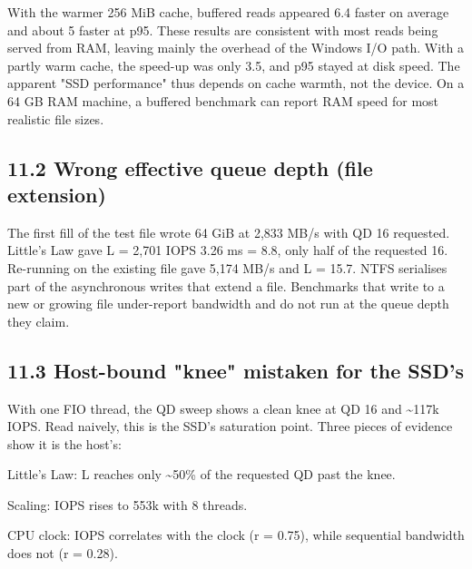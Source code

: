 \documentclass[10pt,letterpaper]{article}
\begin{document}
With the warmer 256 MiB cache, buffered reads appeared 6.4\texttimes{} faster on average and about 5\texttimes{} faster at p95. These results are consistent with most reads being served from RAM, leaving mainly the overhead of the Windows I/O path. With a partly warm cache, the speed-up was only 3.5\texttimes{}, and p95 stayed at disk speed. The apparent "SSD performance" thus depends on cache warmth, not the device. On a 64 GB RAM machine, a buffered benchmark can report RAM speed for most realistic file sizes.


\subsection*{11.2 Wrong effective queue depth (file extension)}

The first fill of the test file wrote 64 GiB at 2,833 MB/s with QD 16 requested. Little's Law gave L = 2,701 IOPS \texttimes{} 3.26 ms = 8.8, only half of the requested 16. Re-running on the existing file gave 5,174 MB/s and L = 15.7. NTFS serialises part of the asynchronous writes that extend a file. Benchmarks that write to a new or growing file under-report bandwidth and do not run at the queue depth they claim.


\subsection*{11.3 Host-bound "knee" mistaken for the SSD's}

With one FIO thread, the QD sweep shows a clean knee at QD 16 and \textasciitilde{}117k IOPS. Read naively, this is the SSD's saturation point. Three pieces of evidence show it is the host's:


\noindent \textbullet{} Little's Law: L reaches only \textasciitilde{}50\% of the requested QD past the knee.\par\smallskip

\noindent \textbullet{} Scaling: IOPS rises to 553k with 8 threads.\par\smallskip

\noindent \textbullet{} CPU clock: IOPS correlates with the clock (r = 0.75), while sequential bandwidth does not (r = 0.28).\par\smallskip

\end{document}
